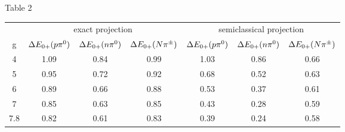 \par
\vspace{5cm}
\centerline{\Large Table 2}
\vspace{2cm}
\begin{center}
\begin{tabular}{c||c|c|c||c|c|c}
          & \multicolumn{3}{|c||}{exact projection} 
	  & \multicolumn{3}{c}{semiclassical projection}  \\  
   g      &$\Delta E_{0+} (p\pi^0)$   &$\Delta E_{0+} (n\pi^0)$  &$\Delta E_{0+} (N\pi^\pm)$
          &$\Delta E_{0+} (p\pi^0)$   &$\Delta E_{0+} (n\pi^0)$  &$\Delta E_{0+} (N\pi^\pm)$\\ \hline\hline
   4      &   1.09 & 0.84 & 0.99 & 1.03 & 0.86 & 0.66 \\ \hline
   5      &   0.95 & 0.72 & 0.92 & 0.68 & 0.52 & 0.63 \\ \hline
   6      &   0.89 & 0.66 & 0.88 & 0.53 & 0.37 & 0.61 \\ \hline
   7      &   0.85 & 0.63 & 0.85 & 0.43 & 0.28 & 0.59 \\ \hline
   7.8    &   0.82 & 0.61 & 0.83 & 0.39 & 0.24 & 0.58 \\
\end{tabular}   
\end{center}
 

